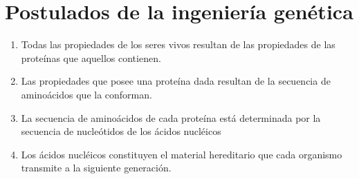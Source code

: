 
\section{Postulados de la ingeniería genética}

\begin{enumerate}
    \item Todas las propiedades de los seres vivos resultan de las propiedades de las proteínas que aquellos contienen.
    \item Las propiedades que posee una proteína dada resultan de la secuencia de aminoácidos que la conforman.
    \item La secuencia de aminoácidos de cada proteína está determinada por la secuencia de nucleótidos de los ácidos nucléicos
    \item Los ácidos nucléicos constituyen el material hereditario que cada organismo transmite a la siguiente generación.
\end{enumerate}